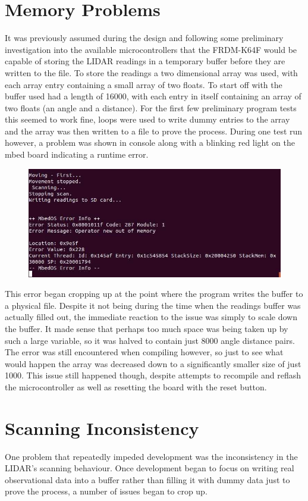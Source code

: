 		\section{Memory Problems}
		It was previously assumed during the design and following some preliminary investigation into the available microcontrollers that the FRDM-K64F would be capable of storing the LIDAR readings in a temporary buffer before they are written to the file. To store the readings a two dimensional array was used, with each array entry containing a small array of two floats. To start off with the buffer used had a length of 16000, with each entry in itself containing an array of two floats (an angle and a distance). For the first few preliminary program tests this seemed to work fine, loops were used to write dummy entries to the array and the array was then written to a file to prove the process. During one test run however, a problem was shown in console along with a blinking red light on the mbed board indicating a runtime error.
		
		\begin{figure}[ht]
			\centering
			\includegraphics[width=.8\linewidth]{SYNTHESIS/memoryerror.jpg}
			\label{fig:memoryerror}
		\end{figure}
		
		This error began cropping up at the point where the program writes the buffer to a physical file. Despite it not being during the time when the readings buffer was actually filled out, the immediate reaction to the issue was simply to scale down the buffer. It made sense that perhaps too much space was being taken up by such a large variable, so it was halved to contain just 8000 angle distance pairs. The error was still encountered when compiling however, so just to see what would happen the array was decreased down to a significantly smaller size of just 1000. This issue still happened though, despite attempts to recompile and reflash the microcontroller as well as resetting the board with the reset button.
		
		\section{Scanning Inconsistency}
		One problem that repeatedly impeded development was the inconsistency in the LIDAR's scanning behaviour. Once development began to focus on writing real observational data into a buffer rather than filling it with dummy data just to prove the process, a number of issues began to crop up.
		
